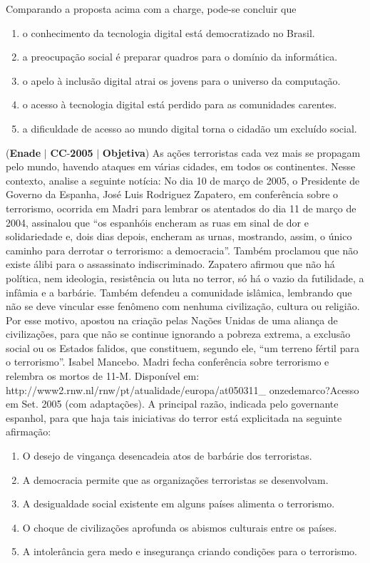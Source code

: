 \documentclass{exam}
\begin{document}
\begin{questions}
Comparando a proposta acima com a charge, pode-se concluir que
	\begin{enumerate}[label=\alph*)]
		\item  o conhecimento da tecnologia digital está democratizado no
Brasil.
		\item  a preocupação social é preparar quadros para o domínio da
informática.
		\item  o apelo à inclusão digital atrai os jovens para o universo da
computação.
		\item  o acesso à tecnologia digital está perdido para as comunidades
carentes.
		\item  a dificuldade de acesso ao mundo digital torna o cidadão um
excluído social.
	\end{enumerate}

\question (\textbf{Enade} $|$ \textbf{CC}-\textbf{2005} $|$ \textbf{Objetiva})
As ações terroristas cada vez mais se propagam pelo mundo,
havendo ataques em várias cidades, em todos os continentes.
Nesse contexto, analise a seguinte notícia:
No dia 10 de março de 2005, o Presidente de Governo da
Espanha, José Luis Rodriguez Zapatero, em conferência sobre o
terrorismo, ocorrida em Madri para lembrar os atentados do dia
11 de março de 2004, assinalou que “os espanhóis encheram as
ruas em sinal de dor e solidariedade e, dois dias depois, encheram
as urnas, mostrando, assim, o único caminho para derrotar o
terrorismo: a democracia”. Também proclamou que não existe
álibi para o assassinato indiscriminado. Zapatero afirmou que não
há política, nem ideologia, resistência ou luta no terror, só há o
vazio da futilidade, a infâmia e a barbárie. Também defendeu a
comunidade islâmica, lembrando que não se deve vincular esse
fenômeno com nenhuma civilização, cultura ou religião. Por esse
motivo, apostou na criação pelas Nações Unidas de uma aliança de
civilizações, para que não se continue ignorando a pobreza
extrema, a exclusão social ou os Estados falidos, que constituem,
segundo ele, “um terreno fértil para o terrorismo”.
Isabel Mancebo. Madri fecha conferência sobre terrorismo e
relembra os mortos de 11-M. Disponível em:
http://www2.rnw.nl/rnw/pt/atualidade/europa/at050311\_
onzedemarco?Acesso em Set. 2005 (com adaptações).
A principal razão, indicada pelo governante espanhol, para que
haja tais iniciativas do terror está explicitada na seguinte
afirmação:
	\begin{enumerate}[label=\alph*)]
		\item  O desejo de vingança desencadeia atos de barbárie dos
terroristas.
		\item  A democracia permite que as organizações terroristas se
desenvolvam.
		\item  A desigualdade social existente em alguns países alimenta o
terrorismo.
		\item  O choque de civilizações aprofunda os abismos culturais
entre os países.
		\item  A intolerância gera medo e insegurança criando condições
para o terrorismo.
	\end{enumerate}


\end{questions}
\end{document}
